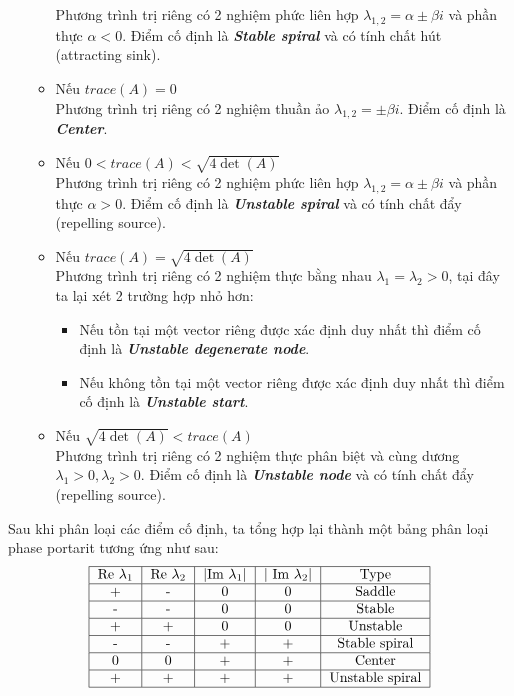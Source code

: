 \begin{itemize}
\begin{itemize}
        Phương trình trị riêng có 2 nghiệm phức liên hợp $\lambda_{1,2}=\alpha \pm \beta i$ và phần thực $\alpha<0$. Điểm cố định là \textbf{\textit{Stable spiral}} và có tính chất hút (attracting sink).
        \item Nếu $trace(A)=0$\\
        Phương trình trị riêng có 2 nghiệm thuần ảo $\lambda_{1,2}=\pm \beta i$. Điểm cố định là \textbf{\textit{Center}}.
        \item Nếu $0<trace(A)<\sqrt{4\det(A)}$\\
        Phương trình trị riêng có 2 nghiệm phức liên hợp $\lambda_{1,2}=\alpha \pm \beta i$ và phần thực $\alpha>0$. Điểm cố định là \textbf{\textit{Unstable spiral}} và có tính chất đẩy (repelling source).
        \item Nếu $trace(A)=\sqrt{4\det(A)}$\\
         Phương trình trị riêng có 2 nghiệm thực bằng nhau $\lambda_1=\lambda_2>0$, tại đây ta lại xét 2 trường hợp nhỏ hơn:
         \begin{itemize}
            \item Nếu tồn tại một vector riêng được xác định duy nhất thì điểm cố định là \textbf{\textit{Unstable degenerate node}}.
            \item Nếu không tồn tại một vector riêng được xác định duy nhất thì điểm cố định là \textbf{\textit{Unstable start}}.
        \end{itemize}
        \item Nếu $\sqrt{4\det(A)}<trace(A)$\\
        Phương trình trị riêng có 2 nghiệm thực phân biệt và cùng dương $\lambda_1>0, \lambda_2>0$. Điểm cố định là \textbf{\textit{Unstable node}} và có tính chất đẩy (repelling source).
    \end{itemize}
\end{itemize}
Sau khi phân loại các điểm cố định, ta tổng hợp lại thành một bảng phân loại phase portarit tương ứng như sau:
\begin{align*}
    \begin{tabular}{|c|c|c|c|c|}
       \hline 
       Re $\lambda_1$  & Re $\lambda_2$ & |Im $\lambda_1$| &| Im $\lambda_2$| & Type \\ \hline
       + & - & 0 & 0 & Saddle \\ \hline
       - & - & 0 & 0 & Stable \\ \hline
       + & + & 0 & 0 & Unstable \\ \hline
       - & - & + & + & Stable spiral \\ \hline
       0 & 0 & + & + & Center \\ \hline
       + & + & + & + & Unstable spiral \\ \hline
    \end{tabular}    
\end{align*}
